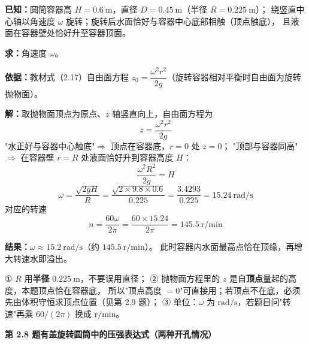 \begin{jie}
\textbf{已知：}圆筒容器高 $H=0.6\ \mathrm{m}$，直径 $D=0.45\ \mathrm{m}$（半径 $R=0.225\ \mathrm{m}$）；
绕竖直中心轴以角速度 $\omega$ 旋转；旋转后水面恰好与容器中心底部相触（顶点触底），
且液面在容器壁处恰好升至容器顶面。

\textbf{求：}角速度 $\omega$。

\textbf{依据：}教材式（2.17）自由面方程 $z_0=\dfrac{\omega^2r^2}{2g}$（旋转容器相对平衡时自由面为旋转抛物面）。

\textbf{解：}取抛物面顶点为原点、$z$ 轴竖直向上，自由面方程为
\[ z=\frac{\omega^2r^2}{2g} \]
"水正好与容器中心触底"$\Rightarrow$ 顶点在容器底，$r=0$ 处 $z=0$；
"顶部与容器同高"$\Rightarrow$ 在容器壁 $r=R$ 处液面恰好升到容器高度 $H$：
\[ \frac{\omega^2R^2}{2g}=H \]
\[ \omega=\frac{\sqrt{2gH}}{R}=\frac{\sqrt{2\times9.8\times0.6}}{0.225}=\frac{3.4293}{0.225}=15.24\ \mathrm{rad/s} \]
对应的转速
\[ n=\frac{60\omega}{2\pi}=\frac{60\times15.24}{2\pi}=145.5\ \mathrm{r/min} \]

\textbf{结果：}$\omega\approx15.2\ \mathrm{rad/s}$（约 $145.5\ \mathrm{r/min}$）。
此时容器内水面最高点恰在顶缘，再增大转速水即溢出。
\end{jie}

\begin{yicuo}
① $R$ 用\textbf{半径} $0.225\ \mathrm{m}$，不要误用直径；
② 抛物面方程里的 $z$ 是自\textbf{顶点}量起的高度，本题顶点恰在容器底，
所以"顶点高度 $=0$"可直接用；若顶点不在底，必须先由体积守恒求顶点位置（见第 2.9 题）；
③ 单位：$\omega$ 为 $\mathrm{rad/s}$，若题目问"转速"再乘 $60/(2\pi)$ 换成 $\mathrm{r/min}$。
\end{yicuo}

\noindent\textbf{第 2.8 题\quad 有盖旋转圆筒中的压强表达式（两种开孔情况）}

